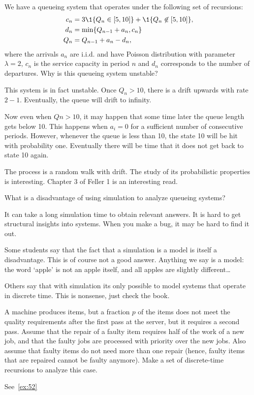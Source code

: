 \begin{exercise}[201807]
We have a queueing system that operates under the following set of recursions:
\begin{align*}
 c_n &= 3\1{Q_n \in [5, 10]} + \1{Q_n \not \in [5, 10]}, \\
d_n &= \min\{Q_{n-1}+a_n, c_n\} \\
Q_n &= Q_{n-1} + a_n - d_n,
\end{align*}
where the arrivals $a_n$ are i.i.d. and have Poisson distribution with parameter $\lambda=2$, $c_n$ is the service capacity in period $n$ and $d_n$ corresponds to the number of departures. Why is this queueing system unstable?
\begin{solution}
This system is in fact unstable. Once $Q_n > 10$, there is a drift upwards with rate $2-1$. Eventually, the queue will drift to infinity. 

Now even when $Qn>10$, it may happen that some time later the queue length gets below 10. This happens when $a_i = 0$ for a sufficient number of consecutive periods. However, whenever the queue is less than 10, the state 10 will be hit with probability one. Eventually there will be time that it does not get back to state 10 again. 

The process is a random walk with drift. The study of its probabilistic properties is interesting. Chapter 3 of Feller 1 is an interesting read. 
\end{solution}
\end{exercise}


\begin{exercise}[201807]
 What is a disadvantage of using simulation to analyze queueing systems?
\begin{solution}
 It can take a long simulation time to obtain relevant answers. It is hard to get structural insights into systems. When you make a bug, it may be hard to find it out.

Some students say that the fact that a simulation is a model is itself a disadvantage. This is of course not a good answer. Anything we say is a model: the word `apple' is not an apple itself, and all apples are slightly different\ldots 

Others say that with simulation its only possible to model systems that operate in discrete time. This is nonsense, just check the book. 
\end{solution}
\end{exercise}


\begin{exercise}[201904]
 A machine produces items, but a fraction $p$ of the items does not meet the quality requirements after the first pass at the server, but it requires a second pass.
 Assume that the repair of a faulty item requires half of the work of a new job, and that the faulty jobs are processed with priority over the new jobs.
 Also assume that faulty items do not need more than one repair (hence, faulty items that are repaired cannot be faulty anymore).
 Make a set of discrete-time recursions to analyze this case.
\begin{solution}
See~\cref{ex:52}
\end{solution}
\end{exercise}


